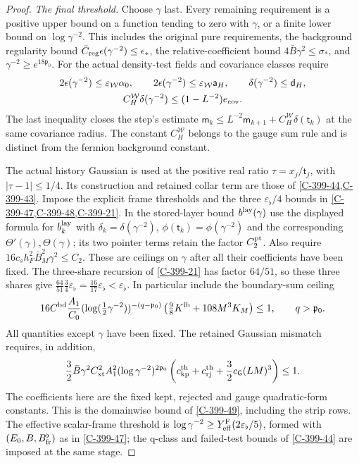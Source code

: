 \documentclass[11pt,letterpaper,reqno]{amsart}
\theoremstyle{definition}
\theoremstyle{remark}
\begin{document}
\begin{proof}
\emph{The final threshold.}
Choose $\gamma$ last. Every remaining requirement is a
positive upper bound on a function tending to zero with
$\gamma$, or a finite lower bound on $\log\gamma^{-2}$.
This includes the original pure requirements, the background
regularity bound $\bar C_{\rm reg}\epsilon(\gamma^{-2})\le\epsilon_*$,
the relative-coefficient bound $4\bar B\gamma^2\le\sigma_*$,
and $\gamma^{-2}\ge e^{18\mathfrak p_0}$.
For the actual density-test fields and covariance classes require
\[
\begin{gathered}
 2\epsilon(\gamma^{-2})\le\varepsilon_{\mathcal W}\alpha_0,
 \qquad 2\epsilon(\gamma^{-2})\le\varepsilon_{\mathcal W}\mathsf a_H,
 \qquad \delta(\gamma^{-2})\le\mathsf d_H,\\
 C_H^{\mathcal W}\delta(\gamma^{-2})
                      \le(1-L^{-2})e_{\rm cov}.
\end{gathered}
\]
The last inequality closes the step's estimate
$\mathsf m_k\le L^{-2}\mathsf m_{k+1}
+C_H^{\mathcal W}\delta(\mathsf t_k)$ at the same covariance
radius. The constant $C_H^{\mathcal W}$ belongs to the gauge
sum rule and is distinct from the fermion background constant.

The actual history Gaussian is used at the positive real
ratio $\tau=x_j/\mathsf t_j$, with $|\tau-1|\le1/4$.
Its construction and retained collar term are those of
\cref{C-399-44,C-399-43}. Impose the explicit frame thresholds
and the three $\varepsilon_\flat/4$ bounds in
\cref{C-399-47,C-399-48,C-399-21}. In the stored-layer
bound $b^{\rm lay}(\gamma)$ use the displayed formula for
$b_k^{\rm lay}$ with $\delta_k=\delta(\gamma^{-2})$,
$\phi(\mathsf t_k)=\phi(\gamma^{-2})$ and the corresponding
$\Theta'(\gamma),\Theta(\gamma)$; its two pointer terms
retain the factor $C_2^{\rm pt}$. Also require
$16c_sh_F^2\bar B_M^2\gamma^2\le C_2$.
These are ceilings on $\gamma$ after all their coefficients
have been fixed. The three-share
recursion of \cref{C-399-21} has factor $64/51$,
so these three shares give
$\frac{64}{51}\frac34\varepsilon_\flat
=\frac{16}{17}\varepsilon_\flat<\varepsilon_\flat$.
In particular include the boundary-sum ceiling
\[
 16C^{\rm bd}\frac{A_1}{C_0}
 (\log(\tfrac12\gamma^{-2}))^{-(q-\mathfrak p_0)}
 \left(\tfrac98K^{\rm lb}+108M^3K_M\right)\le1,
 \qquad q>\mathfrak p_0.
\]
All quantities except $\gamma$ have been fixed.
The retained Gaussian mismatch requires, in addition,
\[
 \frac32\bar B\gamma^2 C_{\rm xt}^2 A_1^2
 (\log\gamma^{-2})^{2\mathfrak p_0}
 \left(c_{\rm kp}^{\rm th}+c_{\rm rj}^{\rm th}
                   +\frac32c_{\mathsf G}(LM)^3\right)\le1.
\]
The coefficients here are the fixed kept, rejected and gauge
quadratic-form constants. This is the domainwise bound of
\cref{C-399-49}, including the strip rows.
The effective scalar-frame threshold is
$\log\gamma^{-2}\ge Y_{\rm eff}^{\rm F}(2\varepsilon_\flat/5)$,
formed with $(E_0,B,B_{\rm fr}^{\flat})$ as in
\cref{C-399-47}; the q-class and failed-test bounds of
\cref{C-399-44} are imposed at the same stage.


\end{proof}
\end{document}
